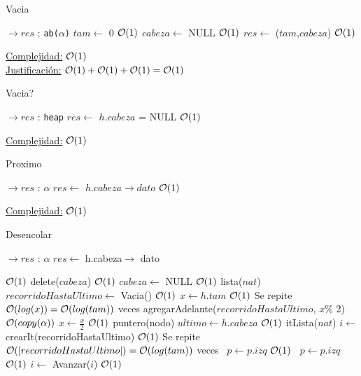 \newpage
\begin{Algoritmos}

\begin{algorithm}
\caption{Vacia}
\begin{algorithmic}[1]
   $\to res$ : \texttt{ab($\alpha$)}
  \State $tam \gets$ 0 \Comment $\mathcal{O}(1)$
  \State $cabeza \gets$ NULL \Comment $\mathcal{O}(1)$
  \State $res \gets$ ($tam$,$cabeza$) \Comment $\mathcal{O}(1)$
 \EndProcedure
\end{algorithmic}
 \underline{Complejidad:} $\mathcal{O}(1)$\\
 \underline{Justificación:} $\mathcal{O}(1)+\mathcal{O}(1)+\mathcal{O}(1) = \mathcal{O}(1)$
\end{algorithm}


\begin{algorithm}
\caption{Vacia?}
\begin{algorithmic}[1]
   $\to res$ : \texttt{heap}
  \State $res \gets$ $h.cabeza$ = NULL \Comment $\mathcal{O}(1)$ 
 \EndProcedure
\end{algorithmic}
 \underline{Complejidad:} $\mathcal{O}(1)$
\end{algorithm}


\begin{algorithm}
\caption{Proximo}
\begin{algorithmic}[1]
   $\to res$ : $\alpha$
  \State $res \gets$ $h.cabeza \to dato$ \Comment $\mathcal{O}(1)$ 
 \EndProcedure
\end{algorithmic}
 \underline{Complejidad:} $\mathcal{O}(1)$
\end{algorithm}



\begin{algorithm}
\caption{Desencolar}
\begin{algorithmic}[1]
   $\to res$ : $\alpha$
  \State $res \gets$ h.cabeza$\to$ dato

   \Comment $\mathcal{O}(1)$
    \State delete($cabeza$) \Comment $\mathcal{O}(1)$
    \State $cabeza \gets$ NULL \Comment $\mathcal{O}(1)$
  \Else
    \State lista($nat$) $recorridoHastaUltimo \gets$ Vacia() \Comment $\mathcal{O}(1)$
    \State $x \gets h.tam$ \Comment $\mathcal{O}(1)$
     \Comment Se repite $\mathcal{O}(log(x)) = \mathcal{O}(log(tam))$ veces
      \State agregarAdelante($recorridoHastaUltimo$, $x$\% 2) \Comment $\mathcal{O}(copy(\alpha))$
      \State $x \gets \frac{x}{2}$ \Comment $\mathcal{O}(1)$
    \EndWhile
    \State puntero(nodo) $ultimo \gets h.cabeza$ \Comment $\mathcal{O}(1)$
    \State itLista($nat$) $i \gets$ crearIt(recorridoHastaUltimo) \Comment $\mathcal{O}(1)$
      \Comment Se repite $\mathcal{O}(|recorridoHastaUltimo|) = \mathcal{O}(log(tam))$ veces
       \ $p \gets p.izq$ \Comment $\mathcal{O}(1)$
      \Else \  $p \gets p.izq$ \Comment $\mathcal{O}(1)$
      \EndIf
      \State $i \gets$ Avanzar($i$) \Comment $\mathcal{O}(1)$
    \EndWhile
    

\end{algorithmic}
\end{algorithm}
\end{Algoritmos}
